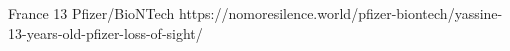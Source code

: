           {France}
          {13}
          {Pfizer/BioNTech}
          {}
          {
          }
          {https://nomoresilence.world/pfizer-biontech/yassine-13-years-old-pfizer-loss-of-sight/}



